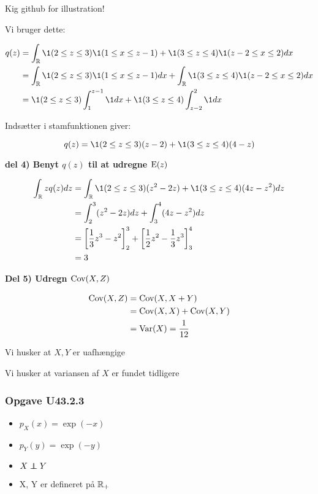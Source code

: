 Kig github for illustration!

Vi bruger dette:

\begin{align}
    q(z) &= \int_\R \1(2 \leq z \leq 3) \1(1 \leq x \leq z-1) +  \1(3 \leq z \leq 4) \1(z-2 \leq x  \leq 2) dx \\
    &= \int_\R \1(2 \leq z \leq 3) \1(1 \leq x \leq z-1) dx + \int_{\R} \1(3 \leq z \leq 4) \1(z-2 \leq x  \leq 2) dx \\
    &=  \1(2 \leq z \leq 3) \int_{1}^{z-1} \1 dx + \1(3 \leq z \leq 4) \int_{z-2}^{2} \1 dx 
\end{align}

Indsætter i stamfunktionen giver:

\begin{equation}
   q(z) = \1(2 \leq z \leq 3)(z-2) + \1(3 \leq z \leq 4)(4 - z) 
\end{equation}

\textbf{del 4) Benyt $q(z)$ til at udregne $\text{E}(z)$}

\begin{align}
    \int_\R z q(z) dz &= \int_{\R}\1(2 \leq z \leq 3)(z^2-2z) + \1(3 \leq z \leq 4)(4z - z^2) dz \\
    &= \int_2^3 (z^2-2z) dz + \int_3^4 (4z - z^2) dz \\
    &=\lsp \frac{1}{3}z^3 - z^2\rsp_2^3 + \lsp \frac{1}{2}z^2 - \frac{1}{3}z^3\rsp_3^4 \\
    &= 3
\end{align}

\textbf{Del 5) Udregn $\text{Cov}(X, Z)$}

\begin{align}
    \text{Cov}(X,Z) &= \text{Cov}(X , X +Y) \\
    &=\text{Cov}(X,X) + \text{Cov}(X,Y) \\
    &= \text{Var}(X) = \frac{1}{12}
\end{align}

Vi husker at $X, Y$ er uafhængige

Vi husker at variansen af $X$ er fundet tidligere


\subsubsection{Opgave U43.2.3}

\begin{itemize}
    \item $p_X(x) = \exp(-x)$
    \item $p_Y(y) = \exp(-y)$
    \item $X \independent Y$
    \item X, Y er defineret på $\mathbb{R}_+$
\end{itemize}

